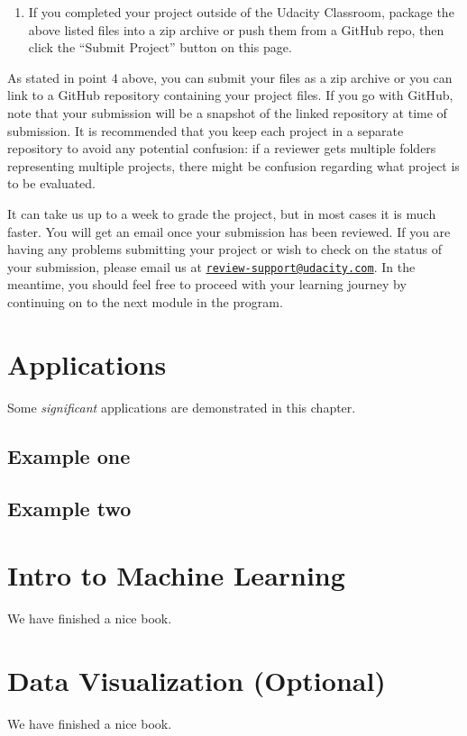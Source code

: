 \documentclass[]{book}
\providecommand{\tightlist}{%
  \setlength{\itemsep}{0pt}\setlength{\parskip}{0pt}}
\begin{document}
\begin{enumerate}
\def\labelenumi{\arabic{enumi}.}
\setcounter{enumi}{3}
\tightlist
\item
  If you completed your project outside of the Udacity Classroom,
  package the above listed files into a zip archive or push them from a
  GitHub repo, then click the ``Submit Project'' button on this page.
\end{enumerate}

As stated in point 4 above, you can submit your files as a zip archive
or you can link to a GitHub repository containing your project files. If
you go with GitHub, note that your submission will be a snapshot of the
linked repository at time of submission. It is recommended that you keep
each project in a separate repository to avoid any potential confusion:
if a reviewer gets multiple folders representing multiple projects,
there might be confusion regarding what project is to be evaluated.

It can take us up to a week to grade the project, but in most cases it
is much faster. You will get an email once your submission has been
reviewed. If you are having any problems submitting your project or wish
to check on the status of your submission, please email us at
\href{mailto:review-support@udacity.com}{\nolinkurl{review-support@udacity.com}}.
In the meantime, you should feel free to proceed with your learning
journey by continuing on to the next module in the program.

\chapter{Applications}\label{applications}

Some \emph{significant} applications are demonstrated in this chapter.

\section{Example one}\label{example-one}

\section{Example two}\label{example-two}

\chapter{Intro to Machine Learning}\label{intro-to-machine-learning}

We have finished a nice book.

\chapter{Data Visualization
(Optional)}\label{data-visualization-optional}

We have finished a nice book.


\end{document}
